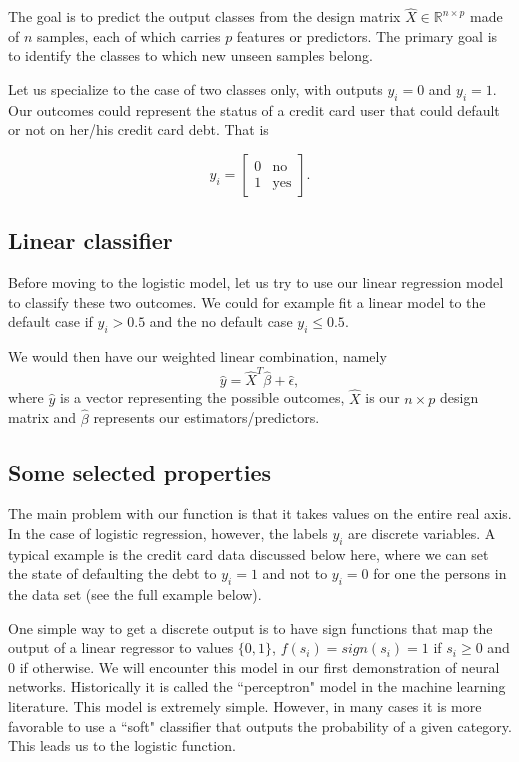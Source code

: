 \documentclass[%
oneside,                 %
final,                   %
10pt]{article}
\begin{document}
The goal is to predict the
output classes from the design matrix $\hat{X}\in\mathbb{R}^{n\times p}$
made of $n$ samples, each of which carries $p$ features or predictors. The
primary goal is to identify the classes to which new unseen samples
belong.

Let us specialize to the case of two classes only, with outputs
$y_i=0$ and $y_i=1$. Our outcomes could represent the status of a
credit card user that could default or not on her/his credit card
debt. That is


\[
y_i = \begin{bmatrix} 0 & \mathrm{no}\\  1 & \mathrm{yes} \end{bmatrix}.
\]



\subsection*{Linear classifier}

Before moving to the logistic model, let us try to use our linear
regression model to classify these two outcomes. We could for example
fit a linear model to the default case if $y_i > 0.5$ and the no
default case $y_i \leq 0.5$.

We would then have our 
weighted linear combination, namely 
\begin{equation}
\hat{y} = \hat{X}^T\hat{\beta} +  \hat{\epsilon},
\end{equation}
where $\hat{y}$ is a vector representing the possible outcomes, $\hat{X}$ is our
$n\times p$ design matrix and $\hat{\beta}$ represents our estimators/predictors.

\subsection*{Some selected properties}

The main problem with our function is that it takes values on the
entire real axis. In the case of logistic regression, however, the
labels $y_i$ are discrete variables. A typical example is the credit
card data discussed below here, where we can set the state of
defaulting the debt to $y_i=1$ and not to $y_i=0$ for one the persons
in the data set (see the full example below).

One simple way to get a discrete output is to have sign
functions that map the output of a linear regressor to values $\{0,1\}$,
$f(s_i)=sign(s_i)=1$ if $s_i\ge 0$ and 0 if otherwise. 
We will encounter this model in our first demonstration of neural networks. Historically it is called the ``perceptron" model in the machine learning
literature. This model is extremely simple. However, in many cases it is more
favorable to use a ``soft" classifier that outputs
the probability of a given category. This leads us to the logistic function.
\end{document}
